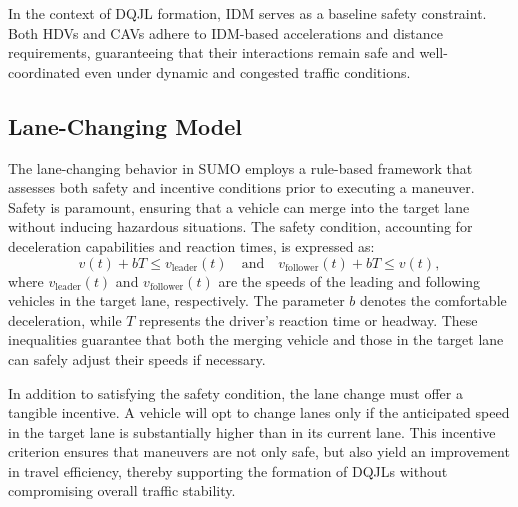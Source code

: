 In the context of DQJL formation, IDM serves as a baseline safety constraint. Both HDVs and CAVs adhere to IDM-based accelerations and distance requirements, guaranteeing that their interactions remain safe and well-coordinated even under dynamic and congested traffic conditions.
\subsection{Lane-Changing Model}\label{subsec:appendix_lane_changing}
The lane-changing behavior in SUMO employs a rule-based framework that assesses both safety and incentive conditions prior to executing a maneuver. Safety is paramount, ensuring that a vehicle can merge into the target lane without inducing hazardous situations. The safety condition, accounting for deceleration capabilities and reaction times, is expressed as:
\[
v(t) + bT \leq v_{\text{leader}}(t) \quad \text{and} \quad v_{\text{follower}}(t) + bT \leq v(t),
\]
where \( v_{\text{leader}}(t) \) and \( v_{\text{follower}}(t) \) are the speeds of the leading and following vehicles in the target lane, respectively. The parameter \( b \) denotes the comfortable deceleration, while \( T \) represents the driver’s reaction time or headway. These inequalities guarantee that both the merging vehicle and those in the target lane can safely adjust their speeds if necessary.

In addition to satisfying the safety condition, the lane change must offer a tangible incentive. A vehicle will opt to change lanes only if the anticipated speed in the target lane is substantially higher than in its current lane. This incentive criterion ensures that maneuvers are not only safe, but also yield an improvement in travel efficiency, thereby supporting the formation of DQJLs without compromising overall traffic stability.

